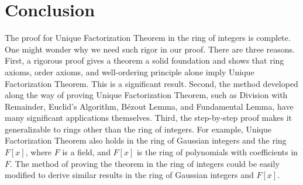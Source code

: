 \documentclass{article}
\begin{document}
\section{Conclusion}
The proof for Unique Factorization Theorem in the ring of integers is complete. One might wonder why we need such rigor in our proof. There are three reasons. First, a rigorous proof gives a theorem a solid foundation and shows that ring axioms, order axioms, and well-ordering principle alone imply Unique Factorization Theorem. This is a significant result. Second, the method developed along the way of proving Unique Factorization Theorem, such as Division with Remainder, Euclid's Algorithm, Bézout Lemma, and Fundamental Lemma, have many significant applications themselves. Third, the step-by-step proof makes it generalizable to rings other than the ring of integers. For example, Unique Factorization Theorem also holds in the ring of Gaussian integers and the ring $F[x]$, where $F$ is a field, and $F[x]$ is the ring of polynomials with coefficients in $F$. The method of proving the theorem in the ring of integers could be easily modified to derive similar results in the ring of Gaussian integers and $F[x]$. 
\end{document}
